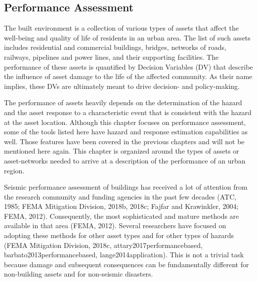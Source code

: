 
\begin{partbacktext}
\part{Performance Assessment}\label{part:Performance}

The built environment is a collection of various types of assets that affect the well-being and quality of life of residents in an urban area. The list of such assets includes residential and commercial buildings, bridges, networks of roads, railways, pipelines and power lines, and their supporting facilities. The performance of these assets is quantified by Decision Variables (DV) that describe the influence of asset damage to the life of the affected community. As their name implies, these DVs are ultimately meant to drive decision- and policy-making.

The performance of assets heavily depends on the determination of the hazard and the asset response to a characteristic event that is consistent with the hazard at the asset location. Although this chapter focuses on performance assessment, some of the tools listed here have hazard and response estimation capabilities as well. Those features have been covered in the previous chapters and will not be mentioned here again. This chapter is organized around the types of assets or asset-networks needed to arrive at a description of the performance of an urban region. 

Seismic performance assessment of buildings has received a lot of attention from the research community and funding agencies in the past few decades (ATC, 1985; FEMA Mitigation Division, 2018b, 2018c; Fajfar and Krawinkler, 2004; FEMA, 2012). Consequently, the most sophisticated and mature methods are available in that area (FEMA, 2012). Several researchers have focused on adopting these methods for other asset types \citep{werner2006redars, chmielewski2016response} and for other types of hazards (FEMA Mitigation Division, 2018c, attary2017performancebased, barbato2013performancebased, lange2014application). This is not a trivial task because damage and subsequent consequences can be fundamentally different for non-building assets and for non-seismic disasters.  

\end{partbacktext}
